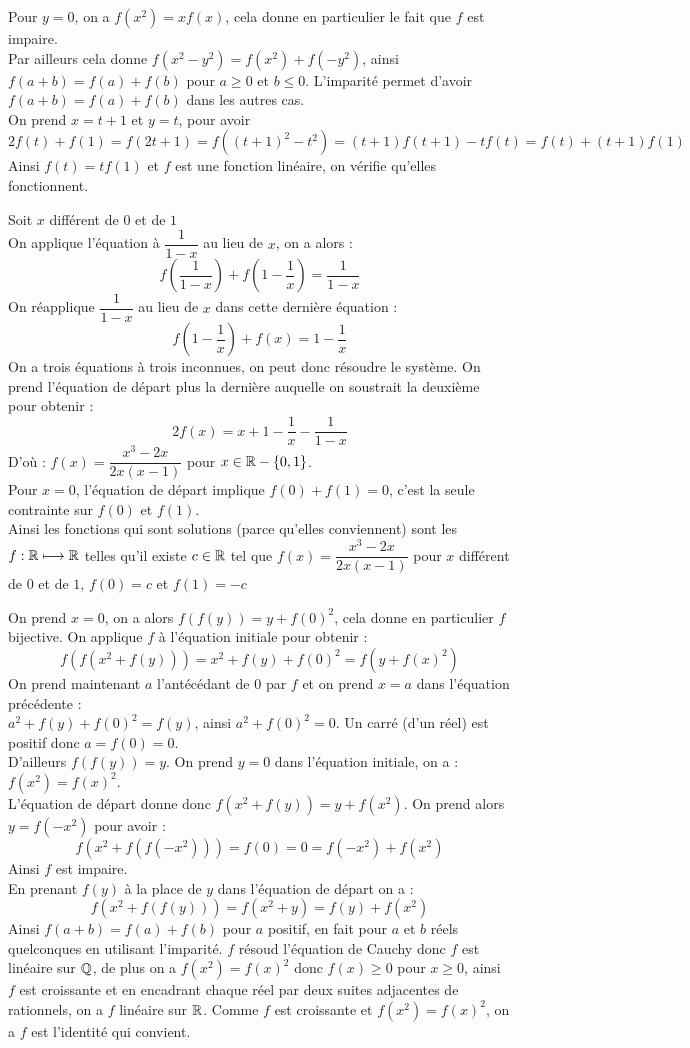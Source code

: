 \begin{sol}[][10]
Pour $y=0$, on a $f(x^2)=xf(x)$, cela donne en particulier le fait que $f$ est impaire.\\
Par ailleurs cela donne $f(x^2-y^2)=f(x^2)+f(-y^2)$, ainsi $f(a+b)=f(a)+f(b)$ pour $a\ge0$ et $b\le0$. L'imparité permet d'avoir $f(a+b)=f(a)+f(b)$ dans les autres cas.\\
On prend $x=t+1$ et $y=t$, pour avoir $$2f(t)+f(1)=f(2t+1)=f((t+1)^2-t^2)=(t+1)f(t+1)-tf(t)=f(t)+(t+1)f(1)$$ Ainsi $f(t)=tf(1)$ et $f$ est une fonction linéaire, on vérifie qu'elles fonctionnent.
\end{sol}
\begin{sol}[][11]
Soit $x$ différent de $0$ et de $1$ \\
On applique l'équation à $\dfrac1{1-x}$ au lieu de $x$, on a alors : $$f\left(\dfrac1{1-x}\right)+f\left(1-\dfrac1x\right)=\dfrac1{1-x}$$
On réapplique $\dfrac1{1-x}$ au lieu de $x$ dans cette dernière équation : $$f\left(1-\dfrac1x\right)+f(x)=1-\dfrac1x$$
On a trois équations à trois inconnues, on peut donc résoudre le système. On prend l'équation de départ plus la dernière auquelle on soustrait la deuxième pour obtenir : $$2f(x)=x+1-\dfrac1x-\dfrac1{1-x}$$
D'où : $f(x)=\dfrac{x^3-2x}{2x(x-1)}$ pour $x\in\mathbb R-\{0,1\}$.\\
Pour $x=0$, l'équation de départ implique $f(0)+f(1)=0$, c'est la seule contrainte sur $f(0)$ et $f(1)$. \\
Ainsi les fonctions qui sont solutions (parce qu'elles conviennent) sont les $f:\mathbb R\longmapsto\mathbb R$ telles qu'il existe $c\in\mathbb R$ tel que $f(x)=\dfrac{x^3-2x}{2x(x-1)}$ pour $x$ différent de $0$ et de $1$, $f(0)=c$ et $f(1)=-c$
\end{sol}

\begin{sol}[][12]
On prend $x=0$, on a alors $f(f(y))=y+f(0)^2$, cela donne en particulier $f$ bijective.
On applique $f$ à l'équation initiale pour obtenir :
$$f(f(x^2+f(y)))=x^2+f(y)+f(0)^2=f(y+f(x)^2)$$
On prend maintenant $a$ l'antécédant de $0$ par $f$ et on prend $x=a$ dans l'équation précédente :\\
$a^2+f(y)+f(0)^2=f(y)$, ainsi $a^2+f(0)^2=0$. Un carré (d'un réel) est positif donc $a=f(0)=0$.\\
D'ailleurs $f(f(y))=y$.
On prend $y=0$ dans l'équation initiale, on a : $f(x^2)=f(x)^2$.\\
L'équation de départ donne donc $f(x^2+f(y))=y+f(x^2)$. On prend alors $y=f(-x^2)$ pour avoir  :
$$f(x^2+f(f(-x^2)))=f(0)=0=f(-x^2)+f(x^2)$$
Ainsi $f$ est impaire.\\
En prenant $f(y)$ à la place de $y$ dans l'équation de départ on a :
$$f(x^2+f(f(y)))=f(x^2+y)=f(y)+f(x^2)$$
Ainsi $f(a+b)=f(a)+f(b)$ pour $a$ positif, en fait pour $a$ et $b$ réels quelconques en utilisant l'imparité. $f$ résoud l'équation de Cauchy donc $f$ est linéaire sur $\mathbb Q$, de plus on a $f(x^2)=f(x)^2$ donc $f(x)\ge0$ pour $x\ge0$, ainsi $f$ est croissante et en encadrant chaque réel par deux suites adjacentes de rationnels, on a $f $ linéaire sur $\mathbb R$. Comme $f$ est croissante et $f(x^2)=f(x)^2$, on a $f$ est l'identité qui convient.
\end{sol}